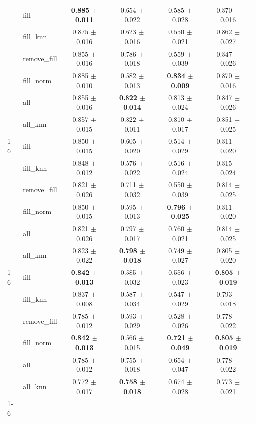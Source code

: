 \begin{table}[htbp]
\begin{tabular}{llcccc}
{{\cline{1-6}
\multirow[t]{7}{*}{30%
 & fill & \textbf{0.885 $\pm$ 0.011} & 0.654 $\pm$ 0.022 & 0.585 $\pm$ 0.028 & 0.870 $\pm$ 0.016 \\
 & fill_knn & 0.875 $\pm$ 0.016 & 0.623 $\pm$ 0.016 & 0.550 $\pm$ 0.021 & 0.862 $\pm$ 0.027 \\
 & remove_fill & 0.855 $\pm$ 0.016 & 0.786 $\pm$ 0.018 & 0.559 $\pm$ 0.039 & 0.847 $\pm$ 0.026 \\
 & fill_norm & 0.885 $\pm$ 0.010 & 0.582 $\pm$ 0.013 & \textbf{0.834 $\pm$ 0.009} & 0.870 $\pm$ 0.016 \\
 & all & 0.855 $\pm$ 0.016 & \textbf{0.822 $\pm$ 0.014} & 0.813 $\pm$ 0.024 & 0.847 $\pm$ 0.026 \\
 & all_knn & 0.857 $\pm$ 0.015 & 0.822 $\pm$ 0.011 & 0.810 $\pm$ 0.017 & 0.851 $\pm$ 0.025 \\
\cline{1-6}
\multirow[t]{7}{*}{40%
 & fill & 0.850 $\pm$ 0.015 & 0.605 $\pm$ 0.020 & 0.514 $\pm$ 0.029 & 0.811 $\pm$ 0.020 \\
 & fill_knn & 0.848 $\pm$ 0.012 & 0.576 $\pm$ 0.022 & 0.516 $\pm$ 0.024 & 0.815 $\pm$ 0.024 \\
 & remove_fill & 0.821 $\pm$ 0.026 & 0.711 $\pm$ 0.032 & 0.550 $\pm$ 0.039 & 0.814 $\pm$ 0.025 \\
 & fill_norm & 0.850 $\pm$ 0.015 & 0.595 $\pm$ 0.013 & \textbf{0.796 $\pm$ 0.025} & 0.811 $\pm$ 0.020 \\
 & all & 0.821 $\pm$ 0.026 & 0.797 $\pm$ 0.017 & 0.760 $\pm$ 0.021 & 0.814 $\pm$ 0.025 \\
 & all_knn & 0.823 $\pm$ 0.022 & \textbf{0.798 $\pm$ 0.018} & 0.749 $\pm$ 0.027 & 0.805 $\pm$ 0.020 \\
\cline{1-6}
\multirow[t]{7}{*}{50%
 & fill & \textbf{0.842 $\pm$ 0.013} & 0.585 $\pm$ 0.032 & 0.556 $\pm$ 0.023 & \textbf{0.805 $\pm$ 0.019} \\
 & fill_knn & 0.837 $\pm$ 0.008 & 0.587 $\pm$ 0.034 & 0.547 $\pm$ 0.029 & 0.793 $\pm$ 0.018 \\
 & remove_fill & 0.785 $\pm$ 0.012 & 0.593 $\pm$ 0.029 & 0.528 $\pm$ 0.026 & 0.778 $\pm$ 0.022 \\
 & fill_norm & \textbf{0.842 $\pm$ 0.013} & 0.566 $\pm$ 0.015 & \textbf{0.721 $\pm$ 0.049} & \textbf{0.805 $\pm$ 0.019} \\
 & all & 0.785 $\pm$ 0.012 & 0.755 $\pm$ 0.018 & 0.654 $\pm$ 0.047 & 0.778 $\pm$ 0.022 \\
 & all_knn & 0.772 $\pm$ 0.017 & \textbf{0.758 $\pm$ 0.018} & 0.674 $\pm$ 0.028 & 0.773 $\pm$ 0.021 \\
\cline{1-6}
\bottomrule
\end{tabular}
\end{table}
